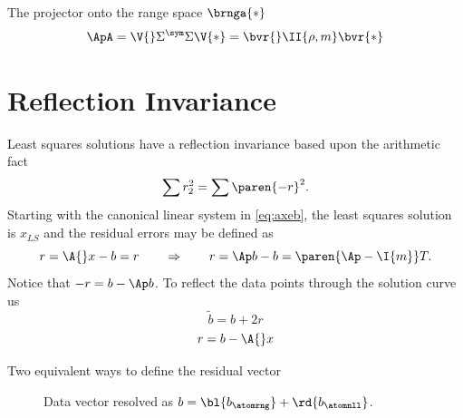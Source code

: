 The projector onto the range space $\brnga{*}$
  \begin{equation*}   %
      \ApA = \V{}\Sigma^{\sym}\Sigma{}\V{*} = \bvr{} \II{\rho,m} \bvr{*}
  \end{equation*}

\section{\label{sec:reflection invariance}Reflection Invariance}  %
Least squares solutions have a reflection invariance based upon the arithmetic fact 
  \begin{equation*}   %
    \sum r_{2}^{2} = \sum \paren{-r}^{2}.
  \end{equation*}
Starting with the canonical linear system in \eqref{eq:axeb}, the least squares solution is $x_{LS}$ and the residual errors may be defined as
  \begin{equation*}   %
    r = \A{}x - b = r \qquad \Rightarrow \qquad r = \Ap b - b = \paren{\Ap - \I{m}}T.
  \end{equation*}
Notice that $-r = b - \Ap b$. To reflect the data points through the solution curve us
  \begin{equation*}   %
    \tilde{b} = b + 2r
  \end{equation*}
  \begin{equation*}   %
      r = b - \A{}x 
  \end{equation*}

Two equivalent ways to define the residual vector
\begin{figure}[htbp] %
   \centering
   \caption{Data vector resolved as $b = \bl{b_{\atomrng}} +  \rd{b_{\atomnll}}$.}
\end{figure}

